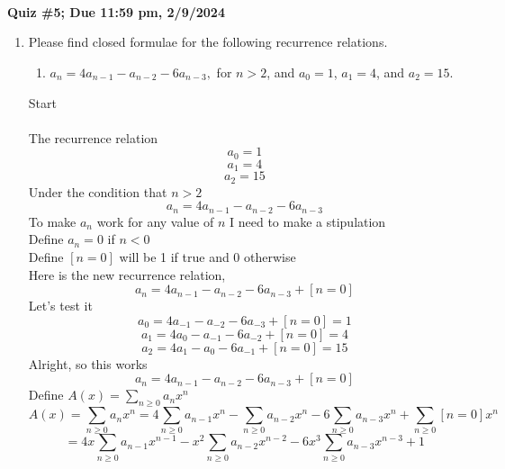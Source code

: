 \documentclass[10pt, AMS Euler]{article}
\begin{document}
	
	\\

        \\
	
	\noindent \underline{\hspace{2in}}\\
	
	{\bf Quiz \#5; Due 11:59 pm, 2/9/2024}\\

        \newpage
	\begin{enumerate}
		\item Please find closed formulae for the following recurrence relations.
		      \begin{enumerate}
			\item $a_n = 4a_{n-1}-a_{n-2} - 6a_{n-3},$ for $n >2$, and $a_0  = 1$, $a_1  = 4$, and $a_2  = 15$.
                \end{enumerate} 
                Start \\
                \\
                The recurrence relation \\
                $$ a_0 = 1 $$
                $$ a_1 = 4 $$
                $$ a_2 = 15 $$
                Under the condition that $n > 2$ \\
                $$ a_n = 4 a_{n-1} - a_{n-2} -6a_{n-3} $$
                To make $a_n$ work for any value of $n$ I need to make a stipulation \\
                Define $a_n = 0$ if $n < 0$ \\
                Define $[n=0]$ will be 1 if true and 0 otherwise \\
                Here is the new recurrence relation, 
                $$ a_n = 4a_{n-1} - a_{n-2} - 6a_{n-3} + [n=0] $$
                Let's test it
                $$ a_0 = 4 a_{-1} - a_{-2} - 6 a_{-3} + [n=0] = 1 $$
                $$ a_1 = 4 a_{0} - a_{-1} - 6 a_{-2} + [n=0] = 4 $$
                $$ a_2 = 4 a_{1} - a_{0} - 6 a_{-1} + [n=0] = 15 $$
                Alright, so this works
                $$ a_n = 4a_{n-1} - a_{n-2} - 6a_{n-3} + [n=0] $$
                Define $ A(x) = \sum_{n\geq0} a_n x^n $
                $$ A(x) = \sum_{n\geq0} a_n x^n = 4 \sum_{n\geq0} a_{n-1} x^n - \sum_{n\geq0} a_{n-2} x^n - 6 \sum_{n\geq0} a_{n-3} x^n + \sum_{n\geq0} [n=0] x^n $$
                $$ = 4x \sum_{n\geq0} a_{n-1} x^{n-1} - x^2 \sum_{n\geq0} a_{n-2} x^{n-2} - 6x^3 \sum_{n\geq0} a_{n-3} x^{n-3} + 1 $$

\end{enumerate}
\end{document}

